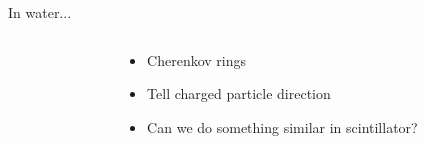 \documentclass[14pt]{beamer}
\begin{document}
\begin{frame}{In water...}
\begin{columns}[T]
\begin{column}{0.5\linewidth}
\begin{block}{}
\begin{tikzpicture}
				\end{tikzpicture}
			\end{block}
		\end{column}
		\begin{column}{0.5\linewidth}
			\begin{block}{}
				\begin{itemize}
					\item<1-> Cherenkov rings
					\item<2-> Tell charged particle direction
					\item<3-> {\color{blue}Can we do something similar in
						scintillator?}
				\end{itemize}
			\end{block}
		\end{column}
	\end{columns}
\end{frame}
\end{document}
